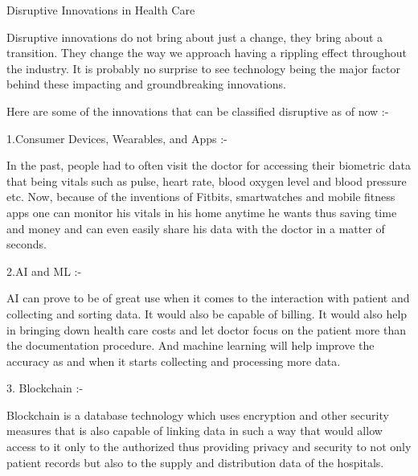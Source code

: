 \documentclass[12pt]{article}
\begin{document}
\begin{Huge}
Disruptive Innovations in Health Care
\end{Huge}
\linebreak
\linebreak
\linebreak
\begin{normalsize}
Disruptive innovations do not bring about just a change, they bring about a transition. They change the way we approach having a rippling effect throughout the industry. It is probably no surprise to see technology being the major factor behind these impacting and groundbreaking innovations.
\linebreak

Here are some of the innovations that can be classified disruptive as of now :-
\linebreak
\linebreak
\raggedright
\begin{Large}
1.Consumer Devices, Wearables, and Apps :-
\end{Large}
\linebreak
In the past, people had to often visit the doctor for accessing their biometric data that being vitals such as pulse, heart rate, blood oxygen level and blood pressure etc. Now, because of the inventions of Fitbits, smartwatches and mobile fitness apps one can monitor his vitals in his home anytime he wants thus saving time and money and can even easily share his data with the doctor in a matter of seconds.
\end{normalsize}
\linebreak
\linebreak
\begin{Large}
2.AI and ML :-
\end{Large}
\linebreak
AI can prove to be of great use when it comes to the interaction with patient and collecting and sorting data. It would also be capable of billing. It would also help in bringing down health care costs and let doctor focus on the patient more than the documentation procedure. And machine learning will help improve the accuracy as and when it starts collecting and processing more data.
\linebreak
\linebreak
\begin{Large}
3. Blockchain :-
\end{Large}
\linebreak
Blockchain is a database technology which uses encryption and other security measures that is also capable of linking data in such a way that would allow access to it only to the authorized thus providing privacy and security to not only patient records but also to the supply and distribution data of the hospitals. 
\end{document}
